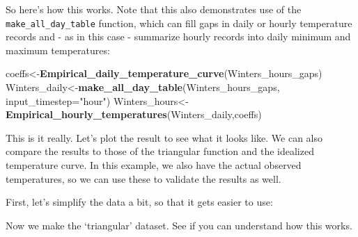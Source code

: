 \documentclass[
]{book}
\newenvironment{Shaded}{\begin{snugshade}}{\end{snugshade}}
\newcommand{\DataTypeTok}[1]{\textcolor[rgb]{0.13,0.29,0.53}{#1}}
\newcommand{\FloatTok}[1]{\textcolor[rgb]{0.00,0.00,0.81}{#1}}
\newcommand{\KeywordTok}[1]{\textcolor[rgb]{0.13,0.29,0.53}{\textbf{#1}}}
\newcommand{\NormalTok}[1]{#1}
\newcommand{\OperatorTok}[1]{\textcolor[rgb]{0.81,0.36,0.00}{\textbf{#1}}}
\newcommand{\StringTok}[1]{\textcolor[rgb]{0.31,0.60,0.02}{#1}}
\begin{document}
So here's how this works. Note that this also demonstrates use of the \texttt{make\_all\_day\_table} function, which can fill gaps in daily or hourly temperature records and - as in this case - summarize hourly records into daily minimum and maximum temperatures:

\begin{Shaded}
\begin{Highlighting}[]
\NormalTok{coeffs<-}\KeywordTok{Empirical_daily_temperature_curve}\NormalTok{(Winters_hours_gaps)}
\NormalTok{Winters_daily<-}\KeywordTok{make_all_day_table}\NormalTok{(Winters_hours_gaps, }\DataTypeTok{input_timestep=}\StringTok{"hour"}\NormalTok{)}
\NormalTok{Winters_hours<-}\KeywordTok{Empirical_hourly_temperatures}\NormalTok{(Winters_daily,coeffs)}
\end{Highlighting}
\end{Shaded}

This is it really. Let's plot the result to see what it looks like. We can also compare the results to those of the triangular function and the idealized temperature curve. In this example, we also have the actual observed temperatures, so we can use these to validate the results as well.

First, let's simplify the data a bit, so that it gets easier to use:

\begin{Shaded}
\end{Shaded}

Now we make the `triangular' dataset. See if you can understand how this works.
\end{document}
